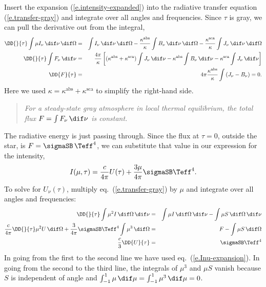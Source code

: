 Insert the expansion (\ref{e.intensity-expanded}) into the radiative transfer equation (\ref{e.transfer-gray}) and integrate over all angles and frequencies. Since $\tau$ is gray, we can pull the derivative out from the integral,
\begin{eqnarray*}
	\DD{}{\tau}\int \mu I_{\nu}\,\dif\nu\,\dif\Omega &=& \int I_{\nu}\,\dif\nu\,\dif\Omega - \frac{\kappa^{\mathrm{abs}}}{\kappa}\int B_{\nu}\,\dif\nu\,\dif\Omega - \frac{\kappa^{\mathrm{sca}}}{\kappa} \int J_{\nu}\,\dif\nu\,\dif\Omega\\
	\DD{}{\tau}\int F_{\nu}\,\dif\nu &=& \frac{4\pi}{\kappa}\left[
		(\kappa^{\mathrm{abs}}+\kappa^{\mathrm{sca}})\int J_{\nu}\,\dif\nu
		- \kappa^{\mathrm{abs}}\int B_{\nu}\,\dif\nu
		- \kappa^{\mathrm{sca}}\int J_{\nu}\,\dif\nu\right]\\
	\DD{F}{\tau} &=& 4\pi\frac{\kappa^{\mathrm{abs}}}{\kappa}\int\left(J_{\nu}-B_{\nu}\right) = 0.
\end{eqnarray*}
Here we used $\kappa = \kappa^{\mathrm{abs}}+\kappa^{\mathrm{sca}}$ to simplify the right-hand side.

\begin{quote}
\emph{For a steady-state gray atmosphere in local thermal equilibrium, the total flux $F = \int F_{\nu}\,\dif\nu$ is constant.}
\end{quote}
The radiative energy is just passing through. Since the flux at $\tau=0$, outside the star, is $F = \sigmaSB\,\Teff^{4}$, we can substitute that value in our expression for the intensity,
\begin{equation}
\label{e.Inu-expansion}
	I(\mu,\tau) = \frac{c}{4\pi} U(\tau) + \frac{3\mu}{4\pi}\sigmaSB\Teff^{4}.
\end{equation}
To solve for $U_{\nu}(\tau)$, multiply eq.~(\ref{e.transfer-gray}) by $\mu$ and integrate over all angles and frequencies:
\begin{eqnarray}
	\DD{}{\tau}\int\mu^{2}I\,\dif\Omega\,\dif\nu &=& \int\mu I\,\dif\Omega\,\dif\nu
		- \int \mu S\,\dif\Omega\,\dif\nu\nonumber\\
	\frac{c}{4\pi}\DD{}{\tau} \mu^{2}U\,\dif\Omega 
		+ \frac{3}{4\pi}\sigmaSB\Teff^{4}\int\mu^{3}\,\dif\Omega &=& F - \int \mu S\,\dif\Omega\nonumber\\
	\frac{c}{3}\DD{U}{\tau} &=& \sigmaSB\Teff^{4}
\label{e.ODE-U}
\end{eqnarray}
In going from the first to the second line we have used eq.~(\ref{e.Inu-expansion}). In going from the second to the third line, the integrals of $\mu^{3}$ and $\mu S$ vanish because $S$ is independent of angle and $\int_{-1}^{1} \mu\,\dif\mu = \int_{-1}^{1}\mu^{3}\,\dif\mu = 0$. 

